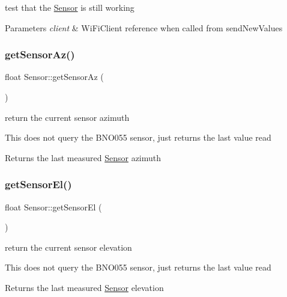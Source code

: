 test that the \hyperlink{class_sensor}{Sensor} is still working 


\begin{DoxyParams}{Parameters}
{\em client} & Wi\+Fi\+Client reference when called from send\+New\+Values \\
\hline
\end{DoxyParams}
\mbox{\label{class_sensor_a12bb1d7269370d6f8571759fd08d285f}} 
\subsubsection{\texorpdfstring{get\+Sensor\+Az()}{getSensorAz()}}
{\footnotesize\ttfamily float Sensor\+::get\+Sensor\+Az (\begin{DoxyParamCaption}{ }\end{DoxyParamCaption})}



return the current sensor azimuth 

This does not query the B\+N\+O055 sensor, just returns the last value read

\begin{DoxyReturn}{Returns}
the last measured \hyperlink{class_sensor}{Sensor} azimuth 
\end{DoxyReturn}
\mbox{\label{class_sensor_a6fd128ef38ef96c21c0b35d95ab68cef}} 
\subsubsection{\texorpdfstring{get\+Sensor\+El()}{getSensorEl()}}
{\footnotesize\ttfamily float Sensor\+::get\+Sensor\+El (\begin{DoxyParamCaption}{ }\end{DoxyParamCaption})}



return the current sensor elevation 

This does not query the B\+N\+O055 sensor, just returns the last value read

\begin{DoxyReturn}{Returns}
the last measured \hyperlink{class_sensor}{Sensor} elevation 
\end{DoxyReturn}
\mbox{\label{class_sensor_a8a27b409dbfc1f335cc8f05cce30e7ec}} 
